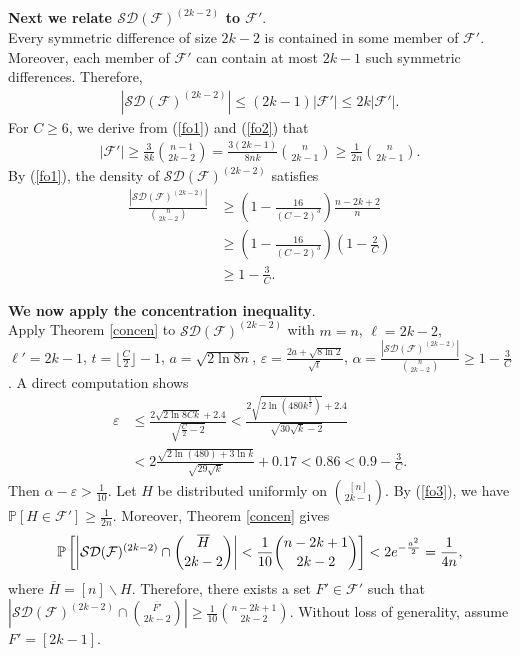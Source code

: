 \documentclass[11pt]{article}
\numberwithin{equation}{section}
\begin{document}
{\bf Next we relate $\mathcal{SD}(\mathcal{F})^{(2k-2)}$ to $\mathcal{F}'$}.  \\ 

Every symmetric difference of size $2k-2$ is contained in some member of $\mathcal{F}'$. Moreover, each member of $\mathcal{F}'$ can contain at most $2k-1$ such symmetric differences. Therefore,
\begin{align}
|\mathcal{SD}(\mathcal{F})^{(2k-2)}| \le (2k-1)|\mathcal{F}'| \le 2k|\mathcal{F}'|.\label{fo2}
\end{align}
For $C\ge6$, we derive from (\ref{fo1}) and  (\ref{fo2}) that
 \begin{align}|\mathcal{F}'| \geq\frac{3}{8k} \binom{n-1}{2k-2} = \frac{3(2k-1)}{8nk} \binom{n}{2k-1} \geq \frac{1}{2n} \binom{n}{2k-1}.\label{fo3}
 \end{align}
By (\ref{fo1}), the density of $\mathcal{SD}(\mathcal{F})^{(2k-2)}$ satisfies
\begin{align*}
 \frac{|\mathcal{SD}(\mathcal{F})^{(2k-2)}|}{\binom{n}{2k-2}} &\geq \left(1 - \frac{16}{(C-2)^3}\right) \frac{n-2k+2}{n} \\
 &\geq \left(1 - \frac{16}{(C-2)^3}\right) \left(1 - \frac{2}{C}\right)\\
 & \geq 1 - \frac{3}{C}.
\end{align*}



{\bf We now apply the concentration inequality}.\\

	Apply Theorem \ref{concen} to $\mathcal{SD}(\mathcal{F})^{(2k-2)}$ with $m=n$, $\ell=2k-2$, $\ell'=2k-1$, $t=\lfloor \frac{C}{2} \rfloor-1$, $a=\sqrt{2\ln 8n}$, $\varepsilon=\frac{2a+\sqrt{8\ln 2}}{\sqrt{t}}$, $\alpha=\frac{|\mathcal{SD}(\mathcal{F})^{(2k-2)}|}{\binom{n}{2k-2}}\ge 1-\frac{3}{C}$.
A direct computation shows
\begin{align*}
 \varepsilon &\le \frac{2\sqrt{2\ln 8Ck} + 2.4}{\sqrt{\frac{C}{2}-2}} 
 < \frac{2\sqrt{2\ln(480k^\frac{3}{2})} + 2.4}{\sqrt{30\sqrt{k}-2} }\\
  &< 2\frac{\sqrt{2\ln(480)+3\ln{k}}}{\sqrt{29\sqrt{k}}} + 0.17 
  < 0.86 < 0.9 - \frac{3}{C}.
\end{align*}
	Then $\alpha-\varepsilon>\frac{1}{10}$.
    Let $H$ be distributed uniformly on $\binom{[n]}{2k-1}$. 
By (\ref{fo3}), we have $\mathbb P\left[H\in \mathcal{F}'\right]\ge \frac{1}{2n}$.
Moreover, Theorem \ref{concen} gives
   $$\mathbb P\left[\left|\mathcal{SD}(\mathcal{F})^{(2k-2)}\cap \binom{\overline{H}}{2k-2}\right|< \frac{1}{10}\binom{n-2k+1}{2k-2}\right]< 2e^{-\frac{\mathstrut{a^2}}{2}}=\frac{1}{4n},$$
   where $\overline{H}=[n]\backslash H$.
	Therefore,  there exists a set $F'\in \mathcal{F}'$ such that $\left|\mathcal{SD}(\mathcal{F})^{(2k-2)}\cap\binom{\overline{F'}}{2k-2}\right|\ge\frac{1}{10}\binom{n-2k+1}{2k-2}$. Without loss of generality,  assume $F'=[2k-1]$.\\
\end{document}
